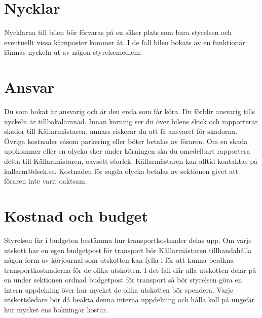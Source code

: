 \documentclass{dsekprotokoll}
\begin{document}
\section{Nycklar}
Nycklarna till bilen bör förvaras på en säker plats som bara styrelsen och eventuellt vissa kärnposter kommer åt. I de fall bilen bokats av en funktionär lämnas nyckeln ut av någon styrelsemedlem.

\section{Ansvar}
Du som bokat är ansvarig och är den enda som får köra. Du förblir ansvarig tills nyckeln är tillbakalämnad. Innan körning ser du över bilens skick och rapporterar skador till Källarmästaren, annars riskerar du att få ansvaret för skadorna. Övriga kostnader såsom parkering eller böter betalas av föraren. Om en skada uppkommer eller en olycka sker under körningen ska du omedelbart rapportera detta till Källarmästaren, oavsett storlek. Källarmästaren kan alltid kontaktas på kallarm@dsek.se. Kostnaden för sagda olycka betalas av sektionen givet att föraren inte varit oaktsam.
\section{Kostnad och budget}
Styrelsen får i budgeten bestämma hur transportkostnader delas upp. Om varje utskott har en egen budgetpost för transport bör Källarmästaren tillhandahålla någon form av körjournal som utskotten kan fylla i för att kunna beräkna transportkostnaderna för de olika utskotten. I det fall där alla utskotten delar på en under sektionen ordnad budgetpost för transport så bör styrelsen göra en intern uppdelning över hur mycket de olika utskotten bör spendera. Varje utskottsledare bör då beakta denna interna uppdelning och hålla koll på ungefär hur mycket ens bokningar kostar.\newline
\end{document}
